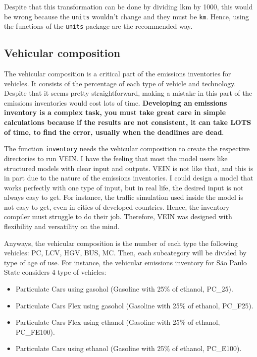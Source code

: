 \documentclass[12pt,graybox,envcountchap,sectrefs]{krantz}
\providecommand{\tightlist}{%
  \setlength{\itemsep}{0pt}\setlength{\parskip}{0pt}}
\theoremstyle{definition}
\theoremstyle{definition}
\theoremstyle{definition}
\theoremstyle{remark}
\begin{document}
Despite that this transformation can be done by dividing lkm by 1000,
this would be wrong because the \texttt{units} wouldn't change and they
must be \texttt{km}. Hence, using the functions of the \texttt{units}
package are the recommended way.

\subsection{Vehicular composition}\label{vehicular-composition-2}

The vehicular composition is a critical part of the emissions
inventories for vehicles. It consists of the percentage of each type of
vehicle and technology. Despite that it seems pretty straightforward,
making a mistake in this part of the emissions inventories would cost
lots of time. \textbf{Developing an} \textbf{emissions inventory is a
complex task, you must take great care in simple} \textbf{calculations
because if the results are not consistent, it can take LOTS} \textbf{of
time, to find the error, usually when the deadlines are dead}.

The function \texttt{inventory} needs the vehicular composition to
create the respective directories to run VEIN. I have the feeling that
most the model users like structured models with clear input and
outputs. VEIN is not like that, and this is in part due to the nature of
the emissions inventories. I could design a model that works perfectly
with one type of input, but in real life, the desired input is not
always easy to get. For instance, the traffic simulation used inside the
model is not easy to get, even in cities of developed countries. Hence,
the inventory compiler must struggle to do their job. Therefore, VEIN
was designed with flexibility and versatility on the mind.

Anyways, the vehicular composition is the number of each type the
following vehicles: PC, LCV, HGV, BUS, MC. Then, each subcategory will
be divided by type of age of use. For instance, the vehicular emissions
inventory for São Paulo State considers 4 type of vehicles:

\begin{itemize}
\tightlist
\item
  Particulate Cars using gasohol (Gasoline with 25\% of ethanol,
  PC\_25).
\item
  Particulate Cars Flex using gasohol (Gasoline with 25\% of ethanol,
  PC\_F25).
\item
  Particulate Cars Flex using ethanol (Gasoline with 25\% of ethanol,
  PC\_FE100).
\item
  Particulate Cars using ethanol (Gasoline with 25\% of ethanol,
  PC\_E100).
\end{itemize}
\end{document}
